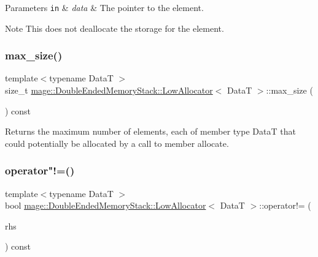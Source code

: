 \begin{DoxyParams}[1]{Parameters}
\mbox{\tt in}  & {\em data} & The pointer to the element. \\
\hline
\end{DoxyParams}
\begin{DoxyNote}{Note}
This does not deallocate the storage for the element. 
\end{DoxyNote}
\hypertarget{structmage_1_1_double_ended_memory_stack_1_1_low_allocator_a3c93f7d3dd550ab89dbb147d0c4e8294}{}\label{structmage_1_1_double_ended_memory_stack_1_1_low_allocator_a3c93f7d3dd550ab89dbb147d0c4e8294} 
\subsubsection{\texorpdfstring{max\+\_\+size()}{max\_size()}}
{\footnotesize\ttfamily template$<$typename DataT $>$ \\
size\+\_\+t \hyperlink{structmage_1_1_double_ended_memory_stack_1_1_low_allocator}{mage\+::\+Double\+Ended\+Memory\+Stack\+::\+Low\+Allocator}$<$ DataT $>$\+::max\+\_\+size (\begin{DoxyParamCaption}{ }\end{DoxyParamCaption}) const\hspace{0.3cm}{\ttfamily [noexcept]}}

Returns the maximum number of elements, each of member type {\ttfamily DataT} that could potentially be allocated by a call to member allocate. \hypertarget{structmage_1_1_double_ended_memory_stack_1_1_low_allocator_a10c035b18789076905b91b3237db83ab}{}\label{structmage_1_1_double_ended_memory_stack_1_1_low_allocator_a10c035b18789076905b91b3237db83ab} 
\subsubsection{\texorpdfstring{operator"!=()}{operator!=()}}
{\footnotesize\ttfamily template$<$typename DataT $>$ \\
bool \hyperlink{structmage_1_1_double_ended_memory_stack_1_1_low_allocator}{mage\+::\+Double\+Ended\+Memory\+Stack\+::\+Low\+Allocator}$<$ DataT $>$\+::operator!= (\begin{DoxyParamCaption}\item[{const \hyperlink{structmage_1_1_double_ended_memory_stack_1_1_low_allocator}{Low\+Allocator}$<$ DataT $>$ \&}]{rhs }\end{DoxyParamCaption}) const\hspace{0.3cm}{\ttfamily [noexcept]}}

